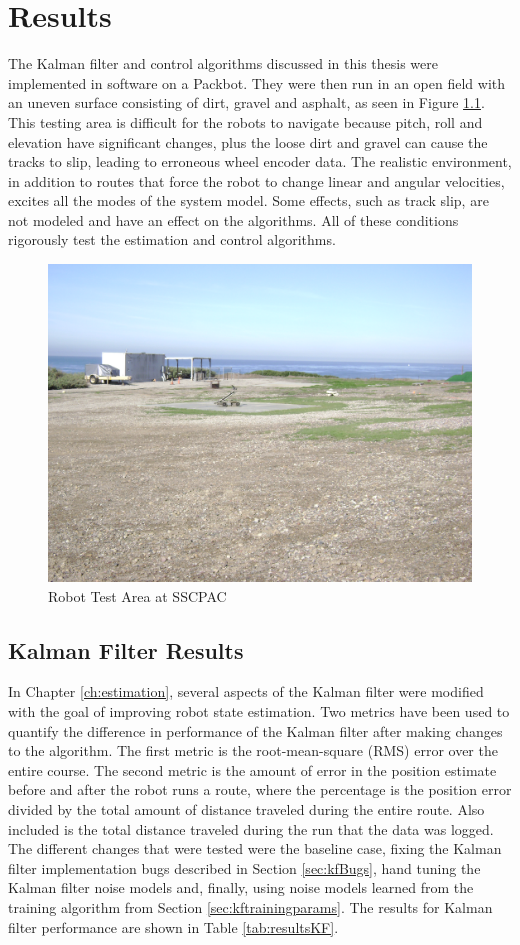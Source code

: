 \chapter{Results}
\label{ch:results}
The Kalman filter and control algorithms discussed in this thesis were implemented in software on a Packbot. They were then run in an open field with an uneven surface consisting of dirt, gravel and asphalt, as seen in Figure \ref{fig:resultsTestArea}. This testing area is difficult for the robots to navigate because pitch, roll and elevation have significant changes, plus the loose dirt and gravel can cause the tracks to slip, leading to erroneous wheel encoder data. The realistic environment, in addition to routes that force the robot to change linear and angular velocities, excites all the modes of the system model. Some effects, such as track slip, are not modeled and have an effect on the algorithms. All of these conditions rigorously test the estimation and control algorithms.

\begin{figure}[ht!]
	\centering
	\includegraphics[width=.75\textwidth]{images/flightFieldTestArea}
	\caption{Robot Test Area at SSCPAC}
	\label{fig:resultsTestArea}
\end{figure}

\section{Kalman Filter Results}
\label{sec:kfResults}
In Chapter \ref{ch:estimation}, several aspects of the Kalman filter were modified with the goal of improving robot state estimation. Two metrics have been used to quantify the difference in performance of the Kalman filter after making changes to the algorithm. The first metric is the root-mean-square (RMS) error over the entire course. The second metric is the amount of error in the position estimate before and after the robot runs a route, where the percentage is the position error divided by the total amount of distance traveled during the entire route. Also included is the total distance traveled during the run that the data was logged. The different changes that were tested were the baseline case, fixing the Kalman filter implementation bugs described in Section \ref{sec:kfBugs}, hand tuning the Kalman filter noise models and, finally, using noise models learned from the training algorithm from Section \ref{sec:kftrainingparams}. The results for Kalman filter performance are shown in Table \ref{tab:resultsKF}.

